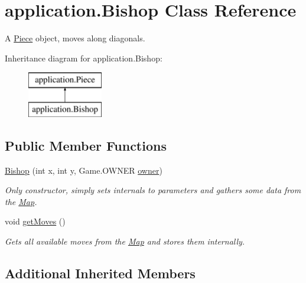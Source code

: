 \hypertarget{classapplication_1_1_bishop}{\section{application.\+Bishop Class Reference}
\label{classapplication_1_1_bishop}
}


A \hyperlink{classapplication_1_1_piece}{Piece} object, moves along diagonals.  


Inheritance diagram for application.\+Bishop\+:\begin{figure}[H]
\begin{center}
\leavevmode
\includegraphics[height=2.000000cm]{classapplication_1_1_bishop}
\end{center}
\end{figure}
\subsection*{Public Member Functions}
\begin{DoxyCompactItemize}
\item 
\hyperlink{classapplication_1_1_bishop_a824e813916e5f1457225e6374c5a102b}{Bishop} (int x, int y, Game.\+O\+W\+N\+E\+R \hyperlink{classapplication_1_1_piece_a724f116bd99a66a6f6bcc8b7b35de131}{owner})
\begin{DoxyCompactList}\small\item\em Only constructor, simply sets internals to parameters and gathers some data from the \hyperlink{classapplication_1_1_map}{Map}. \end{DoxyCompactList}\item 
\hypertarget{classapplication_1_1_bishop_a2b4021dea2118daf0647a19b610d83d9}{void \hyperlink{classapplication_1_1_bishop_a2b4021dea2118daf0647a19b610d83d9}{get\+Moves} ()}\label{classapplication_1_1_bishop_a2b4021dea2118daf0647a19b610d83d9}

\begin{DoxyCompactList}\small\item\em Gets all available moves from the \hyperlink{classapplication_1_1_map}{Map} and stores them internally. \end{DoxyCompactList}\end{DoxyCompactItemize}
\subsection*{Additional Inherited Members}


